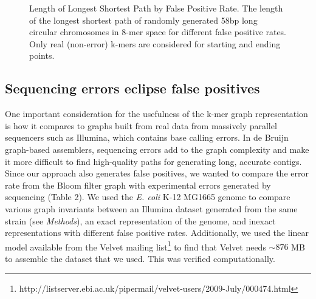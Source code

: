 \documentclass[12pt]{article} \usepackage{simplemargins}
\begin{document}
\begin{figure}
\caption{Length of Longest Shortest Path by False Positive Rate. The 
length of the longest shortest path of randomly generated 58bp 
long circular chromosomes in 8-mer 
space for different false positive rates. Only real (non-error) k-mers are
considered for starting and ending points.}
\end{figure}

\subsection{Sequencing errors eclipse false positives}
One important consideration for the usefulness of the
k-mer graph representation is how it compares to graphs built from
real data from massively parallel sequencers such as Illumina, which
contains base calling errors.  In de Bruijn graph-based assemblers,
sequencing errors add to the graph complexity and make it more
difficult to find high-quality paths for generating long, accurate
contigs. Since our approach also generates false positives, we wanted to
compare the error rate from the Bloom filter graph with experimental
errors generated by sequencing (Table 2). We used the
\emph{E. coli} K-12 MG1665 genome to compare various graph invariants
between an Illumina dataset generated from the same strain (see \emph{Methods}),
an exact representation of the genome, and inexact representations
with different false positive rates. Additionally, we used the linear 
model available 
from the Velvet mailing list\footnote{http://listserver.ebi.ac.uk/pipermail/velvet-users/2009-July/000474.html} to find that Velvet needs $\sim 876$ MB 
to assemble the dataset that we used.  This was verified computationally.
\end{document}
